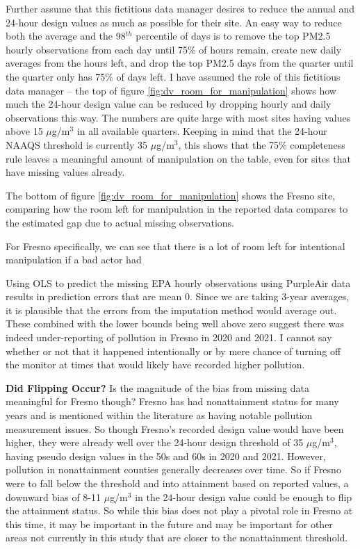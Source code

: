 \documentclass[12pt]{article}
\begin{document}
Further assume that this fictitious data manager desires to reduce the annual and 24-hour design values as much as possible for their site. An easy way to reduce both the average and the 98$^{th}$ percentile of days is to remove the top PM2.5 hourly observations from each day until 75\% of hours remain, create new daily averages from the hours left, and drop the top PM2.5 days from the quarter until the quarter only has 75\% of days left. I have assumed the role of this fictitious data manager -- the top of figure \ref{fig:dv_room_for_manipulation} shows how much the 24-hour design value can be reduced by dropping hourly and daily observations this way. The numbers are quite large with most sites having values above 15 $\mu$g/m$^3$ in all available quarters. Keeping in mind that the 24-hour NAAQS threshold is currently 35 $\mu$g/m$^3$, this shows that the 75\% completeness rule leaves a meaningful amount of manipulation on the table, even for sites that have missing values already.

The bottom of figure \ref{fig:dv_room_for_manipulation} shows the Fresno site, comparing how the room left for manipulation in the reported data compares to the estimated gap due to actual missing observations.

For Fresno specifically, we can see that there is a lot of room left for intentional manipulation if a bad actor had 

\FloatBarrier
Using OLS to predict the missing EPA hourly observations using PurpleAir data results in prediction errors that are mean 0. Since we are taking 3-year averages, it is plausible that the errors from the imputation method would average out. These combined with the lower bounds being well above zero suggest there was indeed under-reporting of pollution in Fresno in 2020 and 2021. I cannot say whether or not that it happened intentionally or by mere chance of turning off the monitor at times that would likely have recorded higher pollution.


\noindent\textbf{Did Flipping Occur?}
Is the magnitude of the bias from missing data meaningful for Fresno though? Fresno has had nonattainment status for many years and is mentioned within the literature as having notable pollution measurement issues. So though Fresno's recorded design value would have been higher, they were already well over the 24-hour design threshold of 35 $\mu$g/m$^3$, having pseudo design values in the 50s and 60s in 2020 and 2021. However, pollution in nonattainment counties generally decreases over time. So if Fresno were to fall below the threshold and into attainment based on reported values, a downward bias of 8-11 $\mu$g/m$^3$ in the 24-hour design value could be enough to flip the attainment status. So while this bias does not play a pivotal role in Fresno at this time, it may be important in the future and may be important for other areas not currently in this study that are closer to the nonattainment threshold.
\end{document}
